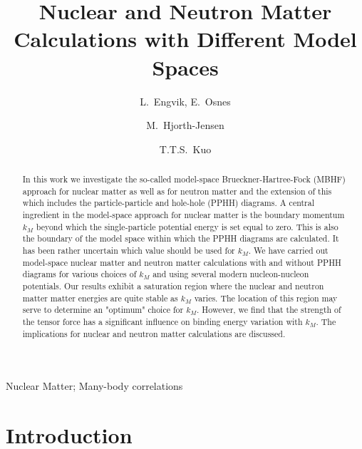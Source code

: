 


\begin{frontmatter}
    
\title{Nuclear and Neutron Matter Calculations with Different Model 
Spaces}

\author{L.\ Engvik, E.\ Osnes}
\address{Department of Physics, University of Oslo, N-0316 Oslo, 
Norway}
\author{M.\ Hjorth-Jensen}
\address{Nordita, Blegdamsvej 17, DK-2100 K\o benhavn \O, Denmark}
\author{T.T.S.\ Kuo}
\address{Department of Physics, State University of New York
at Stony Brook, NY 11794, USA }
\begin{keyword}
Nuclear Matter;
Many-body correlations
\end{keyword}
\maketitle

\begin{abstract}
In this work we investigate the so-called model-space 
Brueckner-Hartree-Fock 
(MBHF) approach for nuclear matter as well as for neutron matter 
and the extension of this which  
includes  the particle-particle and hole-hole (PPHH) diagrams.
A central ingredient in the model-space approach for nuclear matter
is the boundary momentum $k_M$ 
beyond which the single-particle potential energy is set equal to zero.
This is also the boundary of the model space within which 
the PPHH diagrams are calculated.
It has been rather uncertain which value  should be used for $k_M$.
We have carried out model-space nuclear matter and neutron matter 
calculations with and without PPHH diagrams for various 
choices of $k_M$
and using several modern nucleon-nucleon potentials.
Our results exhibit a saturation region where  the 
nuclear and neutron matter 
matter energies  are quite stable  as $k_M$ varies.
The location of this region may serve to determine an "optimum" choice
for $k_M$.
However, we find that the strength of the tensor force has a 
significant influence on binding energy variation with $k_M$.
The implications for nuclear and neutron matter calculations are 
discussed.
\end{abstract}
\end{frontmatter}

\section{Introduction}

